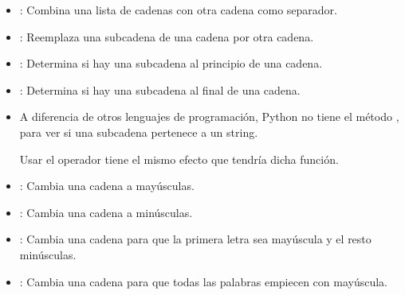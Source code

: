 \begin{itemize}
  \item {}: Combina una lista de cadenas con otra cadena como separador.
  

  \item {}: Reemplaza una subcadena de una cadena por otra cadena.



  \item {}: Determina si hay una subcadena al principio de una cadena.


  \item {}: Determina si hay una subcadena al final de una cadena.
  

  \item A diferencia de otros lenguajes de programación, Python no tiene el método , para ver si una subcadena pertenece a un string.
  
  Usar el operador  tiene el mismo efecto que tendría dicha función.



  \item {}: Cambia una cadena a mayúsculas.
  

  \item {}: Cambia una cadena a minúsculas.
  

  \item {}: Cambia una cadena para que la primera letra sea mayúscula y el resto minúsculas.

  
  \item {}: Cambia una cadena para que todas las palabras empiecen con mayúscula.
  

\end{itemize}

\clearpage